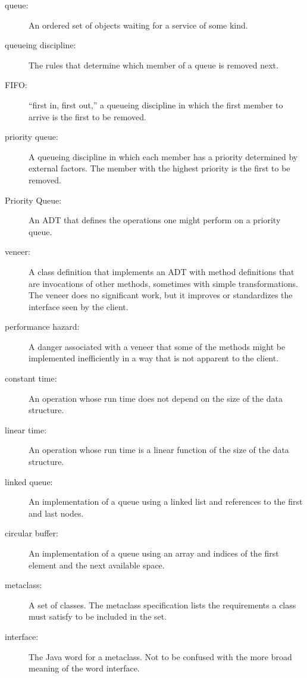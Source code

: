 \documentclass[12pt]{book}
\theoremstyle{exercise}
\begin{document}
\begin{description}

\item[queue:]  An ordered set of objects waiting for a service of
some kind.

\item[queueing discipline:]  The rules that determine which member
of a queue is removed next.

\item[FIFO:]  ``first in, first out,'' a queueing discipline in which
the first member to arrive is the first to be removed.

\item[priority queue:]  A queueing discipline in which
each member has a priority determined by external factors.
The member with the highest priority is the first to be removed.

\item[Priority Queue:]  An ADT that defines the operations one
might perform on a priority queue.

\item[veneer:]  A class definition that implements an ADT with
method definitions that are invocations of other methods, sometimes
with simple transformations.  The veneer does no significant work,
but it improves or standardizes the interface seen by the client.

\item[performance hazard:]  A danger associated with a veneer that
some of the methods might be implemented inefficiently in a way
that is not apparent to the client.

\item[constant time:]  An operation whose run time does not
depend on the size of the data structure.

\item[linear time:]  An operation whose run time is a linear
function of the size of the data structure.

\item[linked queue:]  An implementation of a queue using a linked
list and references to the first and last nodes.

\item[circular buffer:]  An implementation of a queue using an
array and indices of the first element and the next available space.

\item[metaclass:]  A set of classes.  The metaclass specification
lists the requirements a class must satisfy to be included in the set.

\item[interface:]  The Java word for a metaclass.  Not to be
confused with the more broad meaning of the word interface.


\end{description}
\end{document}
